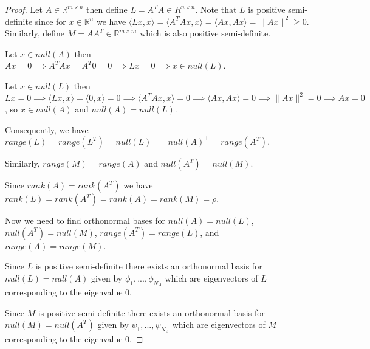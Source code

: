 \documentclass[11pt]{article}
\def\R{{\mathbb{R}}}
\begin{document}
\begin{proof}

\item Let $A \in \R^{m \times n}$ then define $L = A^{T}A \in R^{n \times n}$. Note that $L$ is positive semi-definite since for $x \in \R^n$ we have $\langle Lx, x \rangle = \langle A^{T}Ax, x \rangle = \langle Ax, Ax \rangle = \|Ax\|^2 \geq 0$. Similarly, define $M = AA^T \in \R^{m \times m}$ which is also positive semi-definite.

\item Let $x \in \mathit{null}(A)$ then $Ax = 0 \implies A^{T}Ax = A^{T}0 = 0 \implies Lx = 0 \implies x \in \mathit{null}(L)$.

\item Let $x \in \mathit{null}(L)$ then $Lx = 0 \implies \langle Lx, x \rangle = \langle 0, x \rangle = 0 \implies \langle A^{T}Ax, x \rangle = 0 \implies \langle Ax, Ax \rangle = 0 \implies \|Ax\|^2 = 0 \implies Ax = 0$, so $x \in \mathit{null}(A)$ and $\mathit{null}(A) = \mathit{null}(L)$.

\item Consequently, we have $\mathit{range}(L) = \mathit{range}(L^T) = \mathit{null}(L)^{\perp} = \mathit{null}(A)^{\perp} = \mathit{range}(A^T)$.

\item Similarly, $\mathit{range}(M) = \mathit{range}(A)$ and $\mathit{null}(A^T) = \mathit{null}(M)$.

\item Since $\mathit{rank}(A) = \mathit{rank}(A^T)$ we have $\mathit{rank}(L) = \mathit{rank}(A^T) = \mathit{rank}(A) = \mathit{rank}(M) = \rho$.


\item Now we need to find orthonormal bases for $\mathit{null}(A) = \mathit{null}(L)$, $\mathit{null}(A^T) = \mathit{null}(M)$, $\mathit{range}(A^T) = \mathit{range}(L)$, and $\mathit{range}(A) = \mathit{range}(M)$.

\item Since $L$ is positive semi-definite there exists an orthonormal basis for $\mathit{null}(L) = \mathit{null}(A)$ given by $\phi_1, ..., \phi_{N_A}$ which are eigenvectors of $L$ corresponding to the eigenvalue $0$.

\item Since $M$ is positive semi-definite there exists an orthonormal basis for $\mathit{null}(M) = \mathit{null}(A^T)$ given by $\psi_1, ..., \psi_{N_A}$ which are eigenvectors of $M$ corresponding to the eigenvalue $0$.


\end{proof}
\end{document}
